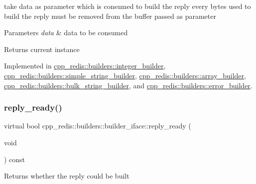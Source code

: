 take data as parameter which is consumed to build the reply every bytes used to build the reply must be removed from the buffer passed as parameter


\begin{DoxyParams}{Parameters}
{\em data} & data to be consumed \\
\hline
\end{DoxyParams}
\begin{DoxyReturn}{Returns}
current instance 
\end{DoxyReturn}


Implemented in \hyperlink{classcpp__redis_1_1builders_1_1integer__builder_ae29f074134f7269db7f947b0fcbe312e}{cpp\+\_\+redis\+::builders\+::integer\+\_\+builder}, \hyperlink{classcpp__redis_1_1builders_1_1simple__string__builder_a159bb512f0427c4a988742f7cd01035e}{cpp\+\_\+redis\+::builders\+::simple\+\_\+string\+\_\+builder}, \hyperlink{classcpp__redis_1_1builders_1_1array__builder_a043357d0ef70406adef4df78c8d5307f}{cpp\+\_\+redis\+::builders\+::array\+\_\+builder}, \hyperlink{classcpp__redis_1_1builders_1_1bulk__string__builder_a43000357f87212f657aafe279a92b541}{cpp\+\_\+redis\+::builders\+::bulk\+\_\+string\+\_\+builder}, and \hyperlink{classcpp__redis_1_1builders_1_1error__builder_af5ac542be148d6f8500de79fa3164798}{cpp\+\_\+redis\+::builders\+::error\+\_\+builder}.

\mbox{\label{classcpp__redis_1_1builders_1_1builder__iface_a40db9a31d4ea1771777e74146d31e12d}} 
\subsubsection{\texorpdfstring{reply\+\_\+ready()}{reply\_ready()}}
{\footnotesize\ttfamily virtual bool cpp\+\_\+redis\+::builders\+::builder\+\_\+iface\+::reply\+\_\+ready (\begin{DoxyParamCaption}\item[{void}]{ }\end{DoxyParamCaption}) const\hspace{0.3cm}{\ttfamily [pure virtual]}}

\begin{DoxyReturn}{Returns}
whether the reply could be built 
\end{DoxyReturn}


